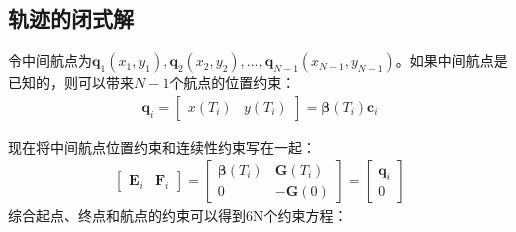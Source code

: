 \documentclass[master,academic]{ysuthesis} %
\begin{document}
		\subsection{轨迹的闭式解} 
		令中间航点为$\bm{q}_1(x_1,y_1),\bm{q}_2(x_2,y_2),...,\bm{q}_{N-1}(x_{N-1},y_{N-1})$。如果中间航点是已知的，则可以带来$N-1$个航点的位置约束：
		\begin{equation}
			\begin{aligned}
				\bm{q}_i = \begin{bmatrix}
					x(T_i)& y(T_i)
				\end{bmatrix} = \bm{\beta}(T_i)\bm{c}_i
			\end{aligned}
		\end{equation}
		
		现在将中间航点位置约束和连续性约束写在一起：
		\begin{equation}
			\begin{aligned}
				\begin{bmatrix}
					\bm{E}_i &\bm{F}_i
				\end{bmatrix}=
				\begin{bmatrix}
					\bm{\beta} ( T_i )& \bm{G}( T_i ) \\
					0 & -\bm{G}( 0 )
				\end{bmatrix}  =\begin{bmatrix}
					\bm{q}_i\\
					0
				\end{bmatrix}
			\end{aligned}
		\end{equation}
		综合起点、终点和航点的约束可以得到6N个约束方程：
\end{document}

